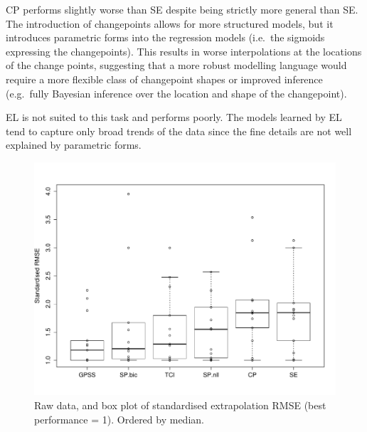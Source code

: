 \documentclass{article}
\def\ie{i.e.\ }
\def\eg{e.g.\ }
\begin{document}
CP performs slightly worse than SE despite being strictly more general than SE.
The introduction of changepoints allows for more structured models, but it introduces parametric forms into the regression models (\ie the sigmoids expressing the changepoints).
This results in worse interpolations at the locations of the change points, suggesting that a more robust modelling language would require a more flexible class of changepoint shapes or improved inference (\eg fully Bayesian inference over the location and shape of the changepoint).

EL is not suited to this task and performs poorly.
The models learned by EL tend to capture only broad trends of the data since the fine details are not well explained by parametric forms.

\begin{figure}[h]
\centering
\includegraphics[width=\columnwidth]{figures/box_extrap}
\caption{
Raw data, and box plot of standardised extrapolation RMSE (best performance = 1).
Ordered by median.
}
\label{fig:box_extrap}
\end{figure}
\end{document}
